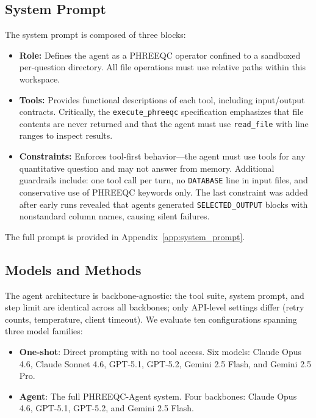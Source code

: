 \documentclass[sigconf,anonymous]{acmart}
\begin{document}
\subsection{System Prompt}
The system prompt is composed of three blocks:
\begin{itemize}[leftmargin=*, itemsep=2pt]
  \item \textbf{Role:} Defines the agent as a PHREEQC operator confined to a sandboxed per-question directory. All file operations must use relative paths within this workspace.
  \item \textbf{Tools:} Provides functional descriptions of each tool, including input/output contracts. Critically, the \texttt{execute\_phreeqc} specification emphasizes that file contents are never returned and that the agent must use \texttt{read\_file} with line ranges to inspect results.
  \item \textbf{Constraints:} Enforces tool-first behavior---the agent must use tools for any quantitative question and may not answer from memory. Additional guardrails include: one tool call per turn, no \texttt{DATABASE} line in input files, and conservative use of PHREEQC keywords only. The last constraint was added after early runs revealed that agents generated \texttt{SELECTED\_OUTPUT} blocks with nonstandard column names, causing silent failures.
\end{itemize}

\noindent The full prompt is provided in Appendix~\ref{app:system_prompt}.

\subsection{Models and Methods}
The agent architecture is backbone-agnostic:
the tool suite, system prompt, and step limit are
identical across all backbones; only API-level
settings differ (retry counts, temperature,
client timeout). We evaluate ten configurations
spanning three model families:
\begin{itemize}[leftmargin=*, itemsep=2pt]
  \item \textbf{One-shot}: Direct prompting with no
    tool access. Six models: Claude Opus 4.6,
    Claude Sonnet 4.6, GPT-5.1, GPT-5.2,
    Gemini 2.5 Flash, and Gemini 2.5 Pro.
  \item \textbf{Agent}: The full PHREEQC-Agent
    system. Four backbones: Claude Opus 4.6,
    GPT-5.1, GPT-5.2, and Gemini 2.5 Flash.
\end{itemize}
\end{document}
